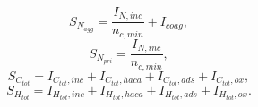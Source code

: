 \begin{equation}
	S_{N_{agg}} = \frac{I_{N,inc}}{n_{c,min}}+I_{coag},
	\label{eqn:S_N_agg}
\end{equation}
\begin{equation}
	S_{N_{pri}} = \frac{I_{N,inc}}{n_{c,min}},
	\label{eqn:S_N_pri}
\end{equation}
\begin{equation}
	S_{C_{tot}} = I_{C_{tot},inc}+I_{C_{tot},haca}+I_{C_{tot},ads}+I_{C_{tot},ox},
	\label{eqn:S_C_tot}
\end{equation}
\begin{equation}
	S_{H_{tot}} = I_{H_{tot},inc}+I_{H_{tot},haca}+I_{H_{tot},ads}+I_{H_{tot},ox}.
	\label{eqn:S_H_tot}
\end{equation}

